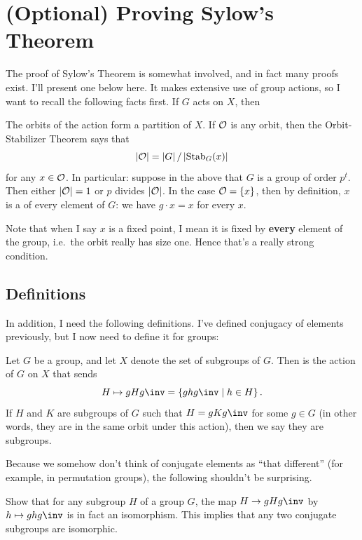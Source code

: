 \section{(Optional) Proving Sylow's Theorem}
The proof of Sylow's Theorem is somewhat involved,
and in fact many proofs exist.  I'll present one below here.
It makes extensive use of group actions,
so I want to recall the following facts first.
If $G$ acts on $X$, then
\begin{itemize}
	\ii The orbits of the action form a partition of $X$.
	\ii If $\mathcal O$ is any orbit, then the Orbit-Stabilizer Theorem says that
	\[ \left\lvert \mathcal O \right\rvert = \left\lvert G \right\rvert / \left\lvert \operatorname{Stab}_G(x) \right\rvert \]
	for any $x \in \mathcal O$.
	\ii In particular: suppose in the above that $G$ is a group of order $p^t$.
	Then either $\left\lvert \mathcal O \right\rvert = 1$ or $p$ divides $\left\lvert \mathcal O \right\rvert$.
	In the case $\mathcal O = \{x\}$, then by definition, $x$ is a  of every element of $G$: we have $g \cdot x = x$ for every $x$.
\end{itemize}
Note that when I say $x$ is a fixed point, I mean it is fixed by \textbf{every} element of the group, i.e.\ the orbit really has size one. Hence that's a really strong condition.

\subsection*{Definitions}
In addition, I need the following definitions.
I've defined conjugacy of elements previously,
but I now need to define it for groups:
\begin{definition}
	Let $G$ be a group, and let $X$ denote the set of subgroups of $G$.
	Then  is the action of $G$ on $X$ that sends
	\[ H \mapsto gHg\inv = \left\{ ghg\inv \mid h \in H \right\}. \]
	If $H$ and $K$ are subgroups of $G$ such that $H = gKg\inv$ for some $g \in G$
	(in other words, they are in the same orbit under this action),
	then we say they are  subgroups.
\end{definition}

Because we somehow don't think of conjugate elements as
``that different'' (for example, in permutation groups),
the following shouldn't be surprising.
\begin{ques}
	Show that for any subgroup $H$ of a group $G$, the map $H \to gHg\inv$ by
	$h \mapsto ghg\inv$ is in fact an isomorphism.
	This implies that any two conjugate subgroups are isomorphic.
\end{ques}

